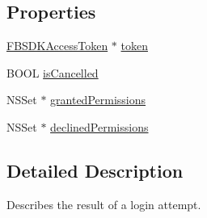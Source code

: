 \subsection*{Properties}
\begin{DoxyCompactItemize}
\item 
\hyperlink{interface_f_b_s_d_k_access_token}{F\-B\-S\-D\-K\-Access\-Token} $\ast$ \hyperlink{interface_f_b_s_d_k_login_manager_login_result_a5140b7c91559db23ec845ffb20369dc9}{token}
\item 
B\-O\-O\-L \hyperlink{interface_f_b_s_d_k_login_manager_login_result_a95ae85cb68f693c343232670c3d1ae64}{is\-Cancelled}
\item 
N\-S\-Set $\ast$ \hyperlink{interface_f_b_s_d_k_login_manager_login_result_ae9fe0eaba0b1fddcf8c681c0a1f85e53}{granted\-Permissions}
\item 
N\-S\-Set $\ast$ \hyperlink{interface_f_b_s_d_k_login_manager_login_result_ae64209439a8f3d962ce548d9581af510}{declined\-Permissions}
\end{DoxyCompactItemize}


\subsection{Detailed Description}
Describes the result of a login attempt. 

